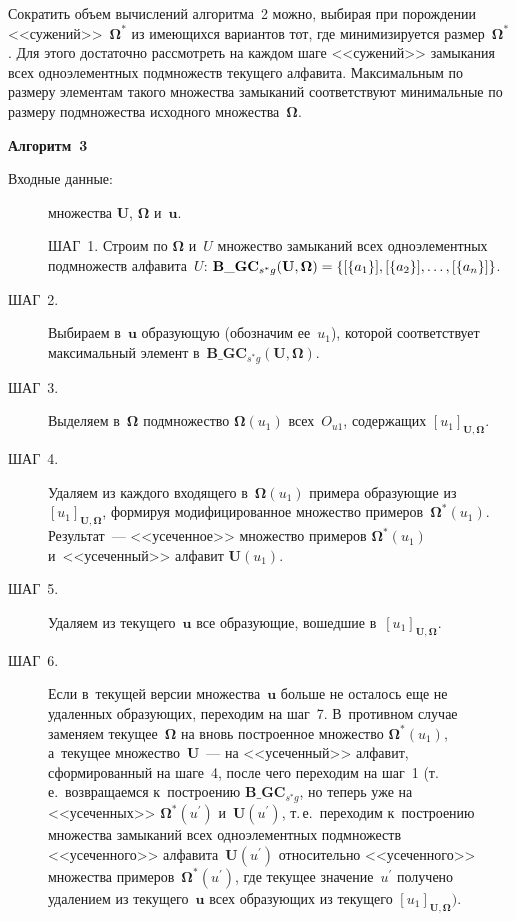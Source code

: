 \begin{multicols}{2}
    Сократить объем вычислений алгоритма~2 можно, выбирая при 
порождении <<сужений>>~${\boldsymbol{\Omega}}^*$ из имеющихся вариантов тот, где 
минимизируется размер~${\boldsymbol{\Omega}}^*$. Для этого достаточно рассмотреть на 
каждом шаге <<сужений>> замыкания всех одноэлементных подмножеств 
текущего алфавита. Максимальным по размеру элементам такого множества 
замыканий соответствуют минимальные по размеру подмножества исходного 
множества~${\boldsymbol{\Omega}}$. 
    
    \medskip
    
\noindent
\textbf{Алгоритм~3}

\begin{description}
\item[Входные данные:] множества $\mathbf{U}$, ${\boldsymbol{\Omega}}$ и~$\mathbf{u}$.

\noindent
ШАГ~1. Строим по ${\boldsymbol{\Omega}}$ и~$U$ множество замыканий всех 
одноэлементных подмножеств алфавита~$U$: 
$\mathbf{B}\_{\mathbf{GC}}_{s^*g}
(\mathbf{U},{\boldsymbol{\Omega}})\hm = \{[\{a_1\}], 
[\{a_2\}], \ldots, [\{a_n\}]\}$.

\item[ШАГ~2.] Выбираем в~$\mathbf{u}$ образующую (обозначим ее~$u_1$), 
которой соответствует максимальный элемент 
в~$\mathbf{B}\_\mathbf{GC}_{s^*g}(\mathbf{U},{\boldsymbol{\Omega}})$.

\item[ШАГ~3.] Выделяем в~${\boldsymbol{\Omega}}$ 
подмножество ${\boldsymbol{\Omega}} (u_1)$ всех~$O_{u1}$, 
содержащих $[u_1]_{\mathbf{U},{\boldsymbol{\Omega}}}$.

\item[ШАГ~4.] Удаляем из каждого входящего в~${\boldsymbol{\Omega}} (u_1)$ примера 
образующие из~$[u_1]_{\mathbf{U},{\boldsymbol{\Omega}}}$, формируя модифицированное 
множество примеров~${\boldsymbol{\Omega}}^*(u_1)$. Результат~--- <<усеченное>> 
множество примеров ${\boldsymbol{\Omega}}^*(u_1)$ и~<<усеченный>> алфавит 
$\mathbf{U}(u_1)$.

\item[ШАГ~5.] Удаляем из текущего~$\mathbf{u}$ все образующие, вошедшие 
в~$[u_1]_{\mathbf{U},{\boldsymbol{\Omega}}}$.

\item[ШАГ~6.] Если в~текущей версии множества~$\mathbf{u}$ больше не осталось 
еще не удаленных образующих, переходим на шаг~7. В~противном случае 
заменяем текущее~${\boldsymbol{\Omega}}$ на вновь построенное множество 
${\boldsymbol{\Omega}}^*(u_1)$, а~текущее множество~$\mathbf{U}$~--- на 
<<усеченный>> алфавит, сформированный на шаге~4, после чего переходим 
на шаг~1 (т.\,е.\ возвращаемся к~построению 
$\mathbf{B}\_\mathbf{GC}_{s^*g}$, но теперь уже на <<усеченных>> 
${\boldsymbol{\Omega}}^*(u^\prime)$ и~$\mathbf{U}(u^\prime)$, т.\,е.\ переходим 
к~построению множества замыканий всех одноэлементных подмножеств 
<<усеченного>> алфавита~$\mathbf{U}(u^\prime)$ относительно 
<<усеченного>> множества примеров~${\boldsymbol{\Omega}}^*(u^\prime)$, где текущее 
значение~$u^\prime$ получено удалением из текущего~$\mathbf{u}$ всех 
образующих из текущего $[u_1]_{\mathbf{U},{\boldsymbol{\Omega}}})$. 


\end{description}
\end{multicols}
